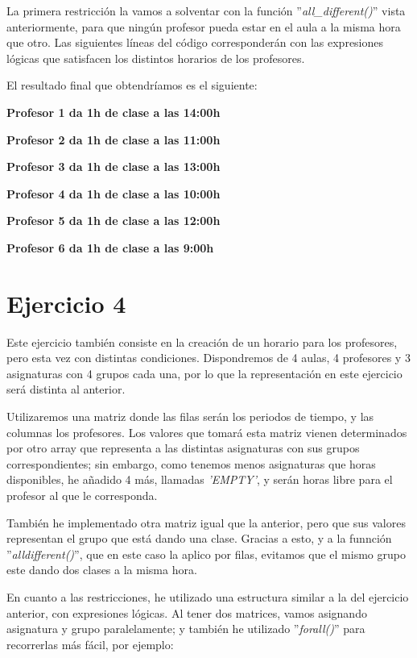 \documentclass[11pt,a4paper]{article}
\begin{document}
La primera restricción la vamos a solventar con la función ''\textit{all\_different()}'' vista anteriormente, para que ningún profesor pueda estar
en el aula a la misma hora que otro. Las siguientes líneas del código corresponderán con las expresiones lógicas que satisfacen los distintos
horarios de los profesores.

El resultado final que obtendríamos es el siguiente:

    \textbf{Profesor 1 da 1h de clase a las 14:00h}

    \textbf{Profesor 2 da 1h de clase a las 11:00h}
    
    \textbf{Profesor 3 da 1h de clase a las 13:00h}
    
    \textbf{Profesor 4 da 1h de clase a las 10:00h}
    
    \textbf{Profesor 5 da 1h de clase a las 12:00h}
    
    \textbf{Profesor 6 da 1h de clase a las 9:00h}



\section*{Ejercicio 4}
Este ejercicio también consiste en la creación de un horario para los profesores, pero esta vez con distintas condiciones. Dispondremos de 4
aulas, 4 profesores y 3 asignaturas con 4 grupos cada una, por lo que la representación en este ejercicio será distinta al anterior.

Utilizaremos una matriz donde las filas serán los periodos de tiempo, y las columnas los profesores. Los valores que tomará esta matriz vienen
determinados por otro array que representa a las distintas asignaturas con sus grupos correspondientes; sin embargo, como tenemos menos
asignaturas que horas disponibles, he añadido 4 más, llamadas \textit{'EMPTY'}, y serán horas libre para el profesor al que le corresponda.

También he implementado otra matriz igual que la anterior, pero que sus valores representan el grupo que está dando una clase. Gracias a esto,
y a la funnción ''\textit{alldifferent()}'', que en este caso la aplico por filas, evitamos que el mismo grupo este dando dos clases a la misma
hora.

En cuanto a las restricciones, he utilizado una estructura similar a la del ejercicio anterior, con expresiones lógicas. Al tener dos matrices,
vamos asignando asignatura y grupo paralelamente; y también he utilizado ''\textit{forall()}'' para recorrerlas más fácil, por ejemplo:
\end{document}
